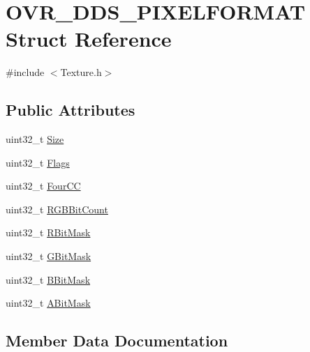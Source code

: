 \hypertarget{struct_o_v_r___d_d_s___p_i_x_e_l_f_o_r_m_a_t}{}\section{O\+V\+R\+\_\+\+D\+D\+S\+\_\+\+P\+I\+X\+E\+L\+F\+O\+R\+M\+AT Struct Reference}
\label{struct_o_v_r___d_d_s___p_i_x_e_l_f_o_r_m_a_t}


{\ttfamily \#include $<$Texture.\+h$>$}

\subsection*{Public Attributes}
\begin{DoxyCompactItemize}
\item 
uint32\+\_\+t \hyperlink{struct_o_v_r___d_d_s___p_i_x_e_l_f_o_r_m_a_t_a36e9f53f78969fa1f1fc7c3424e9564a}{Size}
\item 
uint32\+\_\+t \hyperlink{struct_o_v_r___d_d_s___p_i_x_e_l_f_o_r_m_a_t_a5966f309452d940a4b3ec2cdd169c2fa}{Flags}
\item 
uint32\+\_\+t \hyperlink{struct_o_v_r___d_d_s___p_i_x_e_l_f_o_r_m_a_t_a5b9de7de2eb937c472723d66f240de27}{Four\+CC}
\item 
uint32\+\_\+t \hyperlink{struct_o_v_r___d_d_s___p_i_x_e_l_f_o_r_m_a_t_a3986b797ae77fd2a274744bf93d6626a}{R\+G\+B\+Bit\+Count}
\item 
uint32\+\_\+t \hyperlink{struct_o_v_r___d_d_s___p_i_x_e_l_f_o_r_m_a_t_a3bcaa8b8745f43597deef9248408a96e}{R\+Bit\+Mask}
\item 
uint32\+\_\+t \hyperlink{struct_o_v_r___d_d_s___p_i_x_e_l_f_o_r_m_a_t_a91d43b30eaf50f2eb51ccf500f490793}{G\+Bit\+Mask}
\item 
uint32\+\_\+t \hyperlink{struct_o_v_r___d_d_s___p_i_x_e_l_f_o_r_m_a_t_a4e0f0dd4720c4caf65575223840ab60f}{B\+Bit\+Mask}
\item 
uint32\+\_\+t \hyperlink{struct_o_v_r___d_d_s___p_i_x_e_l_f_o_r_m_a_t_a02aee0d907d689d0116794f08af92670}{A\+Bit\+Mask}
\end{DoxyCompactItemize}


\subsection{Member Data Documentation}
